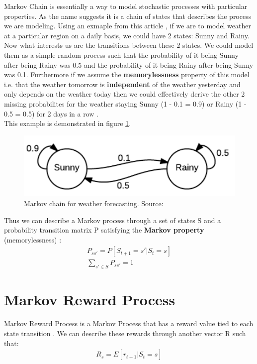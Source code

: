 Markov Chain is essentially a way to model stochastic
processes with
particular properties. As the name suggests it is a chain of
states that describes the process we are modeling. Using an
exmaple from this article \cite{markov_chain_article}, if we
are to model weather at a particular region on a daily basis,
we could have 2 states: Sunny and Rainy. Now what interests us
are the transitions between these 2 states. We could model
them as a simple random process such that the probability of
it being Sunny after being Rainy was 0.5 and the probability
of it being Rainy after being Sunny was 0.1. Furthermore if we
assume the \textbf{memorylessness} property of this model i.e.
that the weather tomorrow is \textbf{independent} of the
weather yesterday and only depends on the weather today then
we could effectively derive the other 2 missing probabilites
for the weather staying Sunny (1 - 0.1 = 0.9) or Rainy (1 -
0.5 = 0.5) for 2 days in a row \cite{markov_chain_article}. \\This example is demonstrated in figure \ref{fig:weather}.

\begin{figure}[H]
  \centering
  \includegraphics[scale=0.7]{figures/markov_weather.PNG}
  \caption{Markov chain for weather forecasting. Source: \cite{markov_chain_article}}
  \label{fig:weather}
\end{figure}

Thus we can describe a Markov process through a set of states S and a probability transition matrix P satisfying the \textbf{Markov property} (memorylessness) \cite{markov_chain_article}:
\begin{align}
    P_{ss'} = P[S_{t+1} = s' | S_{t} = s]\\
    \sum_{s' \in S} P_{ss'} = 1
\end{align}

\section{Markov Reward Process}
Markov Reward Process is a Markov Process that 
has a reward value tied to each state transition \cite{lecture_lets_go_markov}. We can describe these rewards through another vector R such that:
\begin{align}
    R_{s} = E[r_{t+1} | S_{t} = s] \label{eq:return_matrix}
\end{align}

